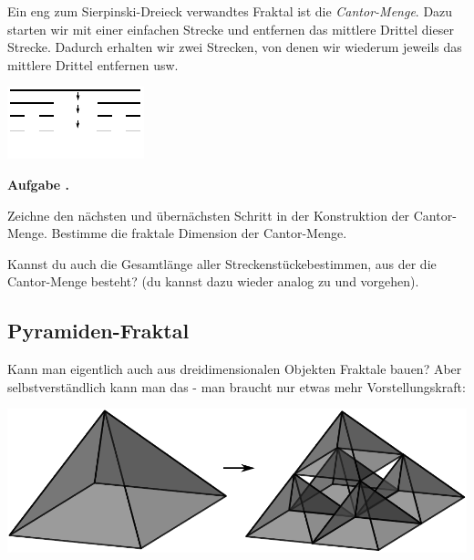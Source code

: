 \documentclass[a4paper,ngerman,12pt]{scrartcl}
\theoremstyle{definition}
\theoremstyle{plain}
\theoremstyle{remark}
\newlength{\aufgabenskip}
\newcounter{aufgabennummer}
\newenvironment{aufgabe}[1]{
  \addtocounter{aufgabennummer}{1}
  \textbf{Aufgabe \theaufgabennummer.} \emph{#1} \par
}{\vspace{\aufgabenskip}}
\begin{document}
Ein eng zum Sierpinski-Dreieck verwandtes Fraktal ist die \emph{Cantor-Menge}. Dazu starten wir mit einer einfachen Strecke und entfernen das mittlere Drittel dieser Strecke. Dadurch erhalten wir zwei Strecken, von denen wir wiederum jeweils das mittlere Drittel entfernen usw.

\begin{center}
	\includegraphics[width=.7\textwidth]{Bilder/Cantor_Menge.pdf}
\end{center}

\begin{aufgabe}{}
	Zeichne den nächsten und übernächsten Schritt in der Konstruktion der Cantor-Menge. Bestimme die fraktale Dimension der Cantor-Menge. 
	
	Kannst du auch die Gesamtlänge aller \glqq Streckenstücke\grqq bestimmen, aus der die Cantor-Menge besteht? (du kannst dazu wieder analog zu  und  vorgehen).
\end{aufgabe}


\subsection{Pyramiden-Fraktal}

Kann man eigentlich auch aus dreidimensionalen Objekten Fraktale bauen? Aber selbstverständlich kann man das - man braucht nur etwas mehr Vorstellungskraft:

\begin{center}
	\includegraphics[width=.6\textwidth]{Bilder/Pyramiden.pdf}
\end{center}
\end{document}
